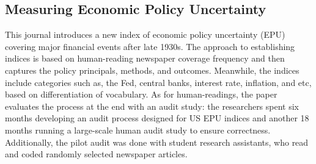 \documentclass[12pt]{article}
\begin{document}
\subsection{Measuring Economic Policy Uncertainty}
This journal introduces a new index of economic policy uncertainty (EPU) covering major financial events after late 1930s. The approach to establishing indices is based on human-reading newspaper coverage frequency and then captures the policy principals, methods, and outcomes. Meanwhile, the indices include categories such as, the Fed, central banks, interest rate, inflation, and etc, based on differentiation of vocabulary. As for human-readings, the paper evaluates the process at the end with an audit study: the researchers spent six months developing an audit process designed for US EPU indices and another 18 months running a large-scale human audit study to ensure correctness. Additionally, the pilot audit was done with student research assistants, who read and coded randomly selected newspaper articles. 
\end{document}
